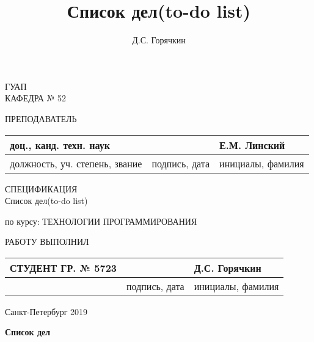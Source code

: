 \documentclass[a4paper,14pt]{extarticle} %
\author{Д.С. Горячкин}
\title{Список дел(to-do list)}
\begin{document}
 
\begin{titlepage} 
\begin{center} 

ГУАП\\ 
КАФЕДРА № 52\\ 
\vspace{2cm} 

\begin{flushleft} 
ПРЕПОДАВАТЕЛЬ 
\begin{tabular}{|l|l|l|} 
\hline 
доц., канд. техн. наук & & Е.М. Линский\\ 
\hline 
должность, уч. степень, звание & подпись, дата & инициалы, фамилия\\ 
\hline 
\end{tabular} 
\end{flushleft} 

\vspace{3cm} 

{\Large СПЕЦИФИКАЦИЯ\\} 
\vspace{0.3cm} 
{\Large Список дел(to-do list)} 

\vspace{0.7cm} 

\begin{flushleft} 
по курсу: ТЕХНОЛОГИИ ПРОГРАММИРОВАНИЯ 
\end{flushleft} 

\vspace{5cm} 

\begin{flushleft} 
РАБОТУ ВЫПОЛНИЛ 
\begin{tabular}{|l|l|l|} 
\hline 
СТУДЕНТ ГР. № 5723 & & Д.С. Горячкин\\ 
\hline 
& подпись, дата & инициалы, фамилия\\ 
\hline 
\end{tabular} 
\end{flushleft} 

\vspace{2cm} 

Санкт-Петербург 2019

\end{center} 
\end{titlepage} 
\renewcommand{\chaptername}{Раздел} 
\renewcommand{\figurename}{Рисунок} 

\begin{center} 
\huge \bf Список дел
\end{center} 
\setcounter{page}{2} 
\end{document}
